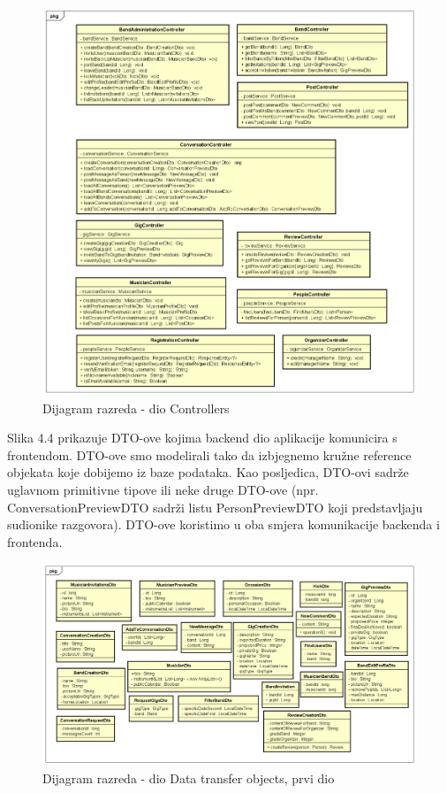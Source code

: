 			\begin{figure}[H]
				\begin{center}
					\includegraphics[width=17cm]{slike/kontroleri.PNG}
				\end{center}
				\caption{Dijagram razreda - dio Controllers}
				\label{fig:kontroleri}
			\end{figure}
		
			Slika 4.4 prikazuje DTO-ove kojima backend dio aplikacije komunicira s frontendom. DTO-ove smo modelirali tako da izbjegnemo kružne reference objekata koje dobijemo iz baze podataka. Kao posljedica, DTO-ovi sadrže uglavnom primitivne tipove ili neke druge DTO-ove (npr. ConversationPreviewDTO sadrži listu PersonPreviewDTO koji predstavljaju sudionike razgovora). DTO-ove koristimo u oba smjera komunikacije backenda i frontenda.
			
			
			\begin{figure}[H]
				\begin{center}
					\includegraphics[width=17cm]{slike/nepovezani_dto.PNG}
				\end{center}
				\caption{Dijagram razreda - dio Data transfer objects, prvi dio}
				\label{fig:dto}
			\end{figure}
		
